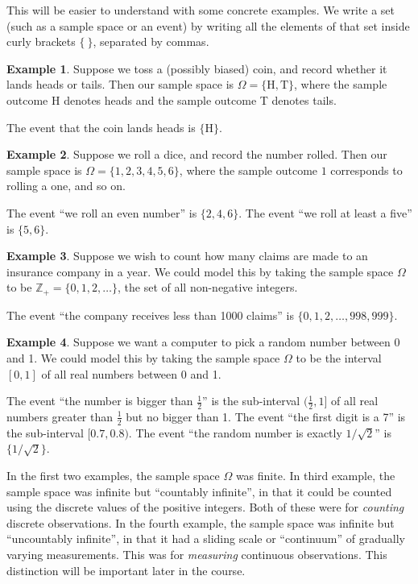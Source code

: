 \documentclass[
  a4paper,
]{book}
\theoremstyle{definition}
\theoremstyle{definition}
\newtheorem{example}{Example}[chapter]
\theoremstyle{definition}
\theoremstyle{definition}
\theoremstyle{remark}
\begin{document}
This will be easier to understand with some concrete examples. We write a set (such as a sample space or an event) by writing all the elements of that set inside curly brackets \(\{\ \}\), separated by commas.

\begin{example}
Suppose we toss a (possibly biased) coin, and record whether it lands heads or tails. Then our sample space is \(\Omega = \{\mathrm H, \mathrm T\}\), where the sample outcome H denotes heads and the sample outcome T denotes tails.

The event that the coin lands heads is \(\{\mathrm H\}\).
\end{example}

\begin{example}
Suppose we roll a dice, and record the number rolled. Then our sample space is \(\Omega = \{1,2,3,4,5,6\}\), where the sample outcome \(1\) corresponds to rolling a one, and so on.

The event ``we roll an even number'' is \(\{2,4,6\}\). The event ``we roll at least a five'' is \(\{5,6\}\).
\end{example}

\begin{example}
Suppose we wish to count how many claims are made to an insurance company in a year. We could model this by taking the sample space \(\Omega\) to be \(\mathbb Z_+ = \{0, 1, 2, \dots\}\), the set of all non-negative integers.

The event ``the company receives less than 1000 claims'' is \(\{0, 1, 2, \dots, 998, 999\}\).
\end{example}

\begin{example}
Suppose we want a computer to pick a random number between 0 and 1. We could model this by taking the sample space \(\Omega\) to be the interval \([0, 1]\) of all real numbers between 0 and 1.

The event ``the number is bigger than \(\frac12\)'' is the sub-interval \((\frac12, 1]\) of all real numbers greater than \(\frac12\) but no bigger than 1. The event ``the first digit is a 7'' is the sub-interval \([0.7, 0.8)\). The event ``the random number is exactly \(1/\sqrt{2}\)'' is \(\{1/\sqrt{2}\}\).
\end{example}

In the first two examples, the sample space \(\Omega\) was finite. In third example, the sample space was infinite but ``countably infinite'', in that it could be counted using the discrete values of the positive integers. Both of these were for \emph{counting} discrete observations. In the fourth example, the sample space was infinite but ``uncountably infinite'', in that it had a sliding scale or ``continuum'' of gradually varying measurements. This was for \emph{measuring} continuous observations. This distinction will be important later in the course.
\end{document}
